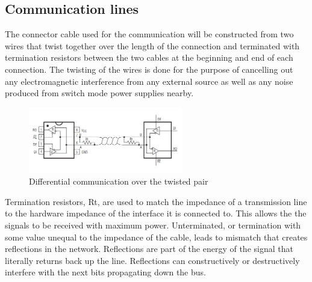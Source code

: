 \newpage
\subsection{Communication lines}
\vspace{-5mm}
The connector cable used for the communication will be constructed from two wires that twist together over the length of the connection and terminated with termination resistors between the two cables at the beginning and end of each connection. The twisting of the wires is done for the purpose of cancelling out any electromagnetic interference from any external source as well as any noise produced from switch mode power supplies nearby\cite{twisted}.

\vspace{-5mm}
\begin{figure}[H]
\centering
\includegraphics[width=0.6\textwidth]{MAX485_example.png}
\vspace{-7mm}
\caption{Differential communication over the twisted pair \cite{twistedpair}}
\end{figure} 
\vspace{-8mm}
Termination resistors, Rt, are used to match the impedance of a transmission line to the hardware impedance of the interface it is connected to. This allows the the signals to be received with maximum power.  Unterminated, or termination with some value unequal to the impedance of the cable, leads to mismatch that creates reflections in the network. Reflections are part of the energy of the signal that literally returns back up the line. Reflections can constructively or destructively interfere with the next bits propagating down the bus\cite{termination}.

\vspace{-7mm}
